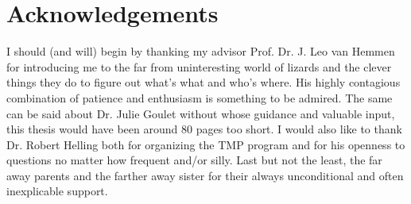 \vspace*{3cm}
\section*{Acknowledgements}
I should (and will) begin by thanking my advisor Prof. Dr. J. Leo van Hemmen
for introducing me to the far from uninteresting world of lizards and
the clever things they do to figure out what's what and who's where. His 
highly contagious combination
of patience and enthusiasm is something to be admired. The same can be said
about Dr. Julie Goulet without whose guidance and valuable input, this thesis would have been around 80
pages too short.
I would also like to thank Dr. Robert Helling both for organizing the TMP program
and for his openness to questions no matter how frequent and/or silly.
Last but not the least, the far away parents and the farther away sister for their always unconditional and often
inexplicable support.